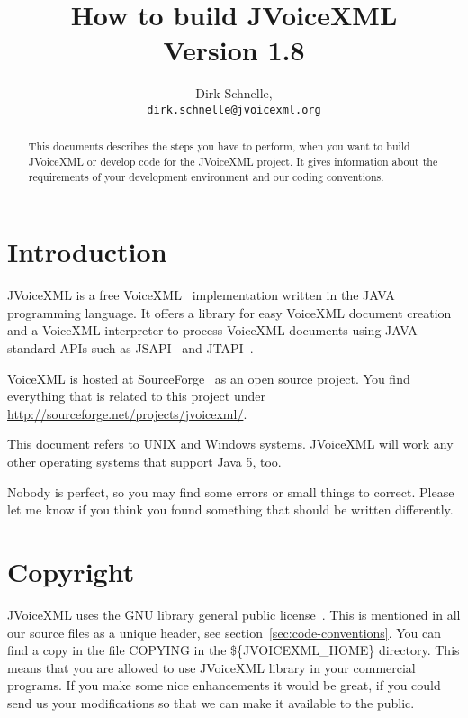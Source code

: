 \documentclass[11pt,a4paper]{article}
\title{How to build JVoiceXML \\
Version 1.8}
\author{Dirk Schnelle,  \\
  \texttt{dirk.schnelle@jvoicexml.org} }
\date{}
\begin{document}
\pagestyle{headings}

\maketitle

\begin{abstract}
This documents describes the steps you have to perform, when you want
to build JVoiceXML or develop code for the JVoiceXML project. It gives
information about the requirements of your development environment 
and our coding conventions.
\end{abstract}

\section{Introduction}
\label{sec:introduction}

JVoiceXML is a free VoiceXML~\cite{w3.org:voicexml} implementation written in 
the JAVA programming language. It offers a library for easy VoiceXML
document creation and a VoiceXML interpreter to process 
VoiceXML documents using JAVA standard APIs such as JSAPI~\cite{sun:jsapi} and
JTAPI~\cite{sun:jsapi}.

VoiceXML is hosted at SourceForge~\cite{sourceforge} as an open source project.
You find everything that is related to this project under
\url{http://sourceforge.net/projects/jvoicexml/}.

This document refers to UNIX and Windows systems. JVoiceXML will work 
any other operating systems that support Java 5, too.

Nobody is perfect, so you may find some errors or small things to correct.
Please let me know if you think you found something that should be written
differently.

\section{Copyright}
\label{sec:copyright}

JVoiceXML uses the GNU library general public license~\cite{gnu:lgpg}. 
This is mentioned in all our source files as a unique header, see
section~\ref{sec:code-conventions}.
You can find a copy in the file COPYING in the \$\{JVOICEXML\_HOME\}
directory. This means that you are allowed to use JVoiceXML
library in your commercial programs. If you make some nice
enhancements it would be great, if you could send us your
modifications so that we can make it available to the public.
\end{document}
